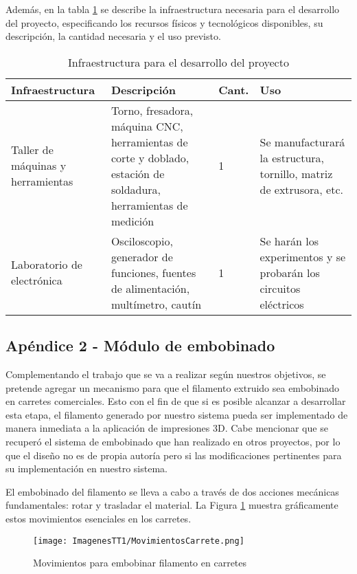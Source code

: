 \documentclass[14pt,oneside]{extarticle} %
\begin{document}
Además, en la tabla \ref{tabla:Infra} se describe la infraestructura necesaria para el desarrollo del proyecto, especificando los recursos físicos y tecnológicos disponibles, su descripción, la cantidad necesaria y el uso previsto. 

\begin{table}[!h]
\centering
\small
\renewcommand{\arraystretch}{1.5}
\setlength{\tabcolsep}{10pt}
\begin{tabular}{|p{3.5cm}|p{5cm}|p{1cm}|p{4cm}|}
\hline
\rowcolor{gray!50}
\textbf{Infraestructura} & \textbf{Descripción} & \textbf{Cant.} & \textbf{Uso} \\
\hline
Taller de máquinas y herramientas & Torno, fresadora, máquina CNC, herramientas de corte y doblado, estación de soldadura, herramientas de medición & 1 & Se manufacturará la estructura, tornillo, matriz de extrusora, etc. \\
\hline
Laboratorio de electrónica & Osciloscopio, generador de funciones, fuentes de alimentación, multímetro, cautín & 1 & Se harán los experimentos y se probarán los circuitos eléctricos \\
\hline
\end{tabular}
\caption{Infraestructura para el desarrollo del proyecto}
\label{tabla:Infra}
\end{table}

\newpage
\subsection{Apéndice 2 - Módulo de embobinado}

Complementando el trabajo que se va a realizar según nuestros objetivos, se pretende agregar un mecanismo para que el filamento extruido sea embobinado en carretes comerciales. Esto con el fin de que si es posible alcanzar a desarrollar esta etapa, el filamento generado por nuestro sistema pueda ser implementado de manera inmediata a la aplicación de impresiones 3D. Cabe mencionar que se recuperó el sistema de embobinado que han realizado en otros proyectos, por lo que el diseño no es de propia autoría pero si las modificaciones pertinentes para su implementación en nuestro sistema.

El embobinado del filamento se lleva a cabo a través de dos acciones mecánicas fundamentales: rotar y trasladar el material. La Figura \ref{fig:MovimientosCarrete} muestra gráficamente estos movimientos esenciales en los carretes.

\begin{figure}[H]
    \centering
    \texttt{[image: ImagenesTT1/MovimientosCarrete.png]}
    \caption{Movimientos para embobinar filamento en carretes \cite{extrusoraPLA}}
    \label{fig:MovimientosCarrete}
\end{figure}
\end{document}
